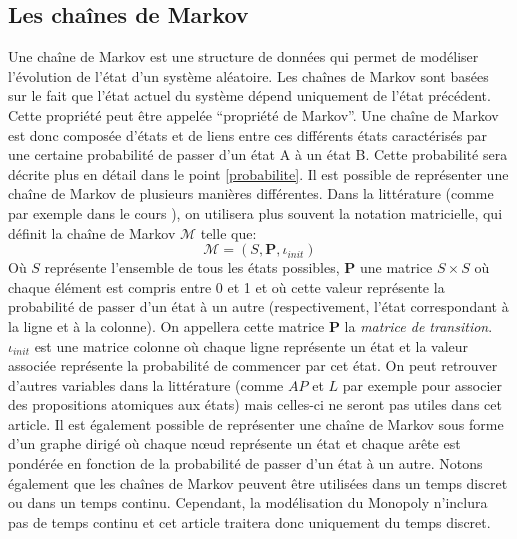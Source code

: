 \documentclass[letterpaper]{article}
\begin{document}
  \subsection{Les chaînes de Markov}
    \label{def_chaine_markov}
    Une chaîne de Markov est une structure de données qui permet de modéliser l'évolution
    de l'état d'un système aléatoire.  Les chaînes de Markov sont basées sur le 
    fait que l'état actuel du système dépend uniquement de l'état précédent.
    Cette propriété peut être appelée ``propriété de Markov''.  Une chaîne de
    Markov est donc composée d'états et de liens entre ces différents états caractérisés
    par une certaine probabilité de passer d'un état A à un état B.
    Cette probabilité sera décrite plus en détail dans le point \ref{probabilite}.
    Il est possible de représenter une chaîne de Markov de plusieurs manières différentes.
    Dans la littérature (comme par exemple dans le cours \citet{COURS}), on utilisera 
    plus souvent la notation matricielle, qui définit la chaîne de Markov $\mathcal{M}$ 
    telle que:
    $$\mathcal{M} = (S, \mathbf{P}, \iota_{init})$$
    Où $S$ représente l'ensemble de tous les états possibles, $\mathbf{P}$ une matrice $S \times S$
    où chaque élément est compris entre 0 et 1 et où cette valeur représente la probabilité 
    de passer d'un état à un autre (respectivement, l'état correspondant à la ligne et à la colonne).
    On appellera cette matrice $\mathbf{P}$ la \textit{matrice de transition}.
    $\iota_{init}$ est une matrice colonne où chaque ligne représente un état et la valeur
    associée représente la probabilité de commencer par cet état.  On peut retrouver d'autres
    variables dans la littérature (comme $AP$ et $L$ par exemple pour associer des propositions 
    atomiques aux états) mais celles-ci ne seront pas utiles dans cet article.
    Il est également possible de représenter une chaîne de Markov sous forme
    d'un graphe dirigé où chaque nœud représente un état et chaque arête est pondérée
    en fonction de la probabilité de passer d'un état à un autre.
    Notons également que les chaînes de Markov peuvent être utilisées
    dans un temps discret ou dans un temps continu.  Cependant, la modélisation
    du Monopoly n’inclura pas de temps continu et cet article traitera donc uniquement
    du temps discret.
    
\end{document}
